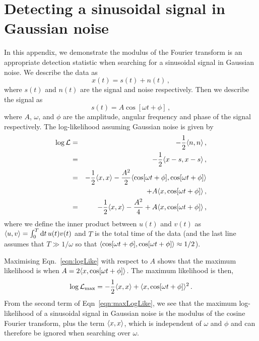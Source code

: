 \documentclass[paper-main.tex]{subfiles}
\begin{document}
\section{Detecting a sinusoidal signal in Gaussian noise}
\label{app:sinusoid_likelihood}
In this appendix, we demonstrate the modulus of the Fourier transform is an appropriate detection statistic when searching for a sinusoidal signal in Gaussian noise. 
We describe the data as
\begin{equation}
x(t) = s(t) + n(t)\,, 
\end{equation}
where $s(t)$ and $n(t)$ are the signal and noise respectively. 
Then we describe the signal as 
\begin{equation}
s(t) = A \cos\left[{\omega t + \phi}\right]\,,
\end{equation}
where $A$, $\omega$, and $\phi$ are the amplitude, angular frequency and phase of the signal respectively. 
The log-likelihood assuming Gaussian noise is given by
\begin{eqnarray}
\log \mathcal{L} &=& -\frac{1}{2}\langle n,n \rangle\,, \\
                 &=& -\frac{1}{2}\langle x-s,x-s \rangle\,, \\ 
                 &=& -\frac{1}{2}\langle x,x \rangle - \frac{A^2}{2} \langle \cos[\omega t + \phi],\cos[\omega t + \phi] \rangle \nonumber\\
                 &&+ A \langle x,\cos[\omega t + \phi] \rangle\,,\\ 
                 &=& -\frac{1}{2}\langle x,x \rangle - \frac{A^2}{4} + A \langle x,\cos[\omega t + \phi] \rangle\,,\label{eqn:logLike}
\end{eqnarray}
where we define the inner product between $u(t)$ and $v(t)$ as $\langle u,v \rangle = \int_0^T \mathrm{d} t \, u(t) v(t) $ and $T$ is the total time of the data (and the last line assumes that $T\gg1/\omega$ so that $\langle \cos[\omega t + \phi],\cos[\omega t + \phi] \rangle\approx{1/2}$). 

Maximising Eqn.~\ref{eqn:logLike} with respect to $A$ shows that the maximum likelihood is when $A = 2\langle x,\cos[\omega t + \phi] \rangle$. 
The maximum likelihood is then, 
\begin{eqnarray}
\label{eqn:maxLogLike}
\log \mathcal{L}_\mathrm{max} = - \frac{1}{2} \langle x,x \rangle + \langle x,\cos[\omega t + \phi] \rangle^2\,. 
\end{eqnarray}
From the second term of Eqn~\ref{eqn:maxLogLike}, we see that the maximum log-likelihood of a sinusoidal signal in Gaussian noise is the modulus of the cosine Fourier transform, plus the term $\langle x,x \rangle$, which is independent of $\omega$ and $\phi$ and can therefore be ignored when searching over $\omega$.
\end{document}
